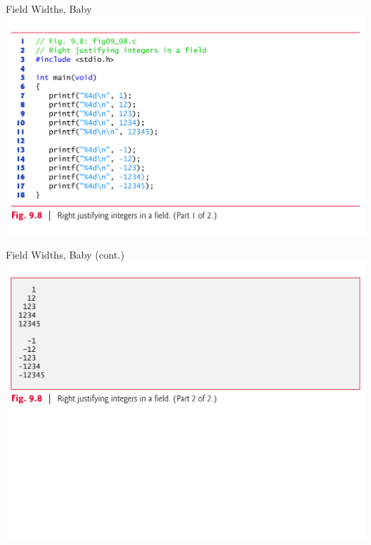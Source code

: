 \documentclass[11pt]{beamer}
\begin{document}
\begin{frame}{Field Widths, Baby}
\center
\includegraphics[scale=0.12]{width.png}
\end{frame}

\begin{frame}{Field Widths, Baby (cont.)}
\center
\includegraphics[scale=0.35]{width2.png}
\end{frame}
\end{document}
